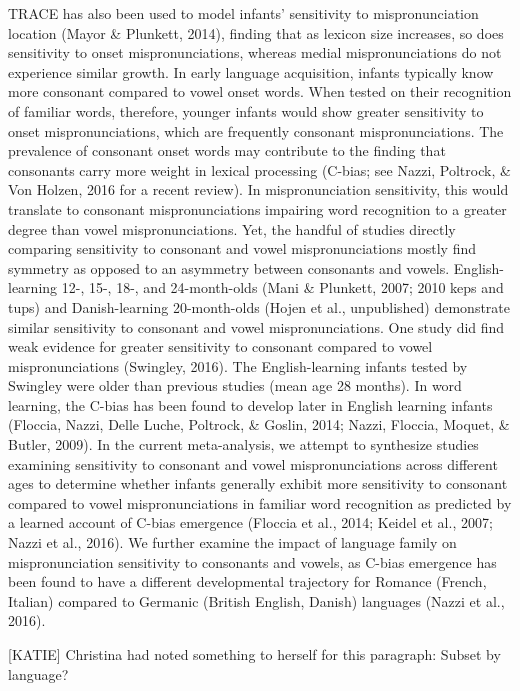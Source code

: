 \documentclass[man]{apa6}
\theoremstyle{definition}
\theoremstyle{definition}
\theoremstyle{definition}
\theoremstyle{remark}
\begin{document}
TRACE has also been used to model infants' sensitivity to
mispronunciation location (Mayor \& Plunkett, 2014), finding that as
lexicon size increases, so does sensitivity to onset mispronunciations,
whereas medial mispronunciations do not experience similar growth. In
early language acquisition, infants typically know more consonant
compared to vowel onset words. When tested on their recognition of
familiar words, therefore, younger infants would show greater
sensitivity to onset mispronunciations, which are frequently consonant
mispronunciations. The prevalence of consonant onset words may
contribute to the finding that consonants carry more weight in lexical
processing (C-bias; see Nazzi, Poltrock, \& Von Holzen, 2016 for a
recent review). In mispronunciation sensitivity, this would translate to
consonant mispronunciations impairing word recognition to a greater
degree than vowel mispronunciations. Yet, the handful of studies
directly comparing sensitivity to consonant and vowel mispronunciations
mostly find symmetry as opposed to an asymmetry between consonants and
vowels. English-learning 12-, 15-, 18-, and 24-month-olds (Mani \&
Plunkett, 2007; 2010 keps and tups) and Danish-learning 20-month-olds
(Hojen et al., unpublished) demonstrate similar sensitivity to consonant
and vowel mispronunciations. One study did find weak evidence for
greater sensitivity to consonant compared to vowel mispronunciations
(Swingley, 2016). The English-learning infants tested by Swingley were
older than previous studies (mean age 28 months). In word learning, the
C-bias has been found to develop later in English learning infants
(Floccia, Nazzi, Delle Luche, Poltrock, \& Goslin, 2014; Nazzi, Floccia,
Moquet, \& Butler, 2009). In the current meta-analysis, we attempt to
synthesize studies examining sensitivity to consonant and vowel
mispronunciations across different ages to determine whether infants
generally exhibit more sensitivity to consonant compared to vowel
mispronunciations in familiar word recognition as predicted by a learned
account of C-bias emergence (Floccia et al., 2014; Keidel et al., 2007;
Nazzi et al., 2016). We further examine the impact of language family on
mispronunciation sensitivity to consonants and vowels, as C-bias
emergence has been found to have a different developmental trajectory
for Romance (French, Italian) compared to Germanic (British English,
Danish) languages (Nazzi et al., 2016).

{[}KATIE{]} Christina had noted something to herself for this paragraph:
Subset by language?
\end{document}
